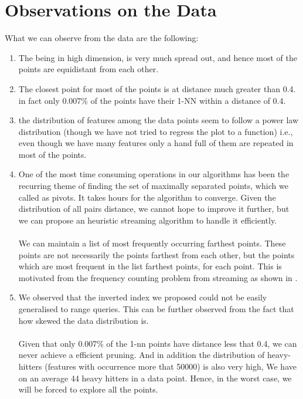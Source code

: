 \section{Observations on the Data}

What we can observe from the data are the following:
\begin{enumerate}

\item {The being in high dimension, is very much spread out, and hence most of the points are equidistant from each other.}\\

\item {The closest point for most of the points is at distance much greater than 0.4. in fact only 0.007\% of the points have their 1-NN within a distance of 0.4.}\\

\item {the distribution of features among the data points seem to follow a power law distribution (though we have not tried to regress the plot to a function) i.e., even though we have many features only a hand full of them are repeated in most of the points.}\\

\item {One of the most time consuming operations in our algorithms has been the recurring theme of finding the set of maximally separated points, which we called as pivots. It takes hours for the algorithm to converge. Given the distribution of all pairs distance, we cannot hope to improve it further, but we can propose an heuristic streaming algorithm to handle it efficiently.\\ \\
	We can maintain a list of most frequently occurring farthest points. These points are not necessarily the points farthest from each other, but the points which are most frequent in the list farthest points, for each point. This is motivated from the frequency counting problem from streaming as shown in \citet*{metwally2005efficient}.}\\

\item  {We observed that the inverted index we proposed could not be easily generalised  to range queries. This can be further observed from the fact that how skewed the data distribution is.\\ \\
	Given that only 0.007\% of the 1-nn points have distance less that 0.4, we can never achieve a efficient pruning. And in addition the distribution of heavy-hitters (features with occurrence more that 50000) is also very high, We have on an average 44 heavy hitters in a data point. Hence, in the worst case, we will be forced to explore all the points.} \\


\end{enumerate}
